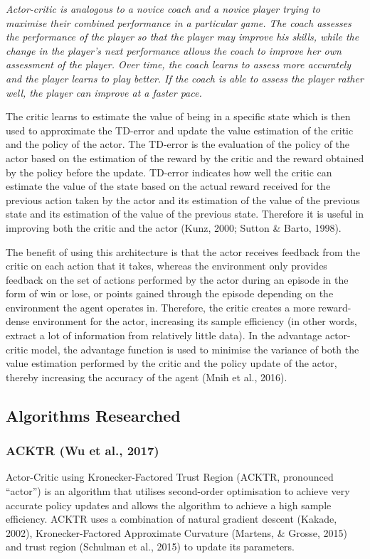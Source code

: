 \textit{Actor-critic is analogous to a novice coach and a novice player trying to maximise their combined performance in a particular game. The coach assesses the performance of the player so that the player may improve his skills, while the change in the player\rq s next performance allows the coach to improve her own assessment of the player. Over time, the coach learns to assess more accurately and the player learns to play better. If the coach is able to assess the player rather well, the player can improve at a faster pace.}

The critic learns to estimate the value of being in a specific state which is then used to approximate the TD-error and update the value estimation of the critic and the policy of the actor. The TD-error is the evaluation of the policy of the actor based on the estimation of the reward by the critic and the reward obtained by the policy before the update. TD-error indicates how well the critic can estimate the value of the state based on the actual reward received for the previous action taken by the actor and its estimation of the value of the previous state and its estimation of the value of the previous state. Therefore it is useful in improving both the critic and the actor (Kunz, 2000; Sutton \& Barto, 1998). 

The benefit of using this architecture is that the actor receives feedback from the critic on each action that it takes, whereas the environment only provides feedback on the set of actions performed by the actor during an episode in the form of win or lose, or points gained through the episode depending on the environment the agent operates in. Therefore, the critic creates a more reward-dense environment for the actor, increasing its sample efficiency (in other words, extract a lot of information from relatively little data). In the advantage actor-critic model, the advantage function is used to minimise the variance of both the value estimation performed by the critic and the policy update of the actor, thereby increasing the accuracy of the agent (Mnih et al., 2016).

\subsection*{Algorithms Researched}
\subsubsection*{ACKTR (Wu et al., 2017)}
Actor-Critic using Kronecker-Factored Trust Region (ACKTR, pronounced “actor”) is an algorithm that utilises second-order optimisation to achieve very accurate policy updates and allows the algorithm to achieve a high sample efficiency. ACKTR uses a combination of natural gradient descent (Kakade, 2002), Kronecker-Factored Approximate Curvature (Martens, \& Grosse, 2015) and trust region (Schulman et al., 2015) to update its parameters. 

